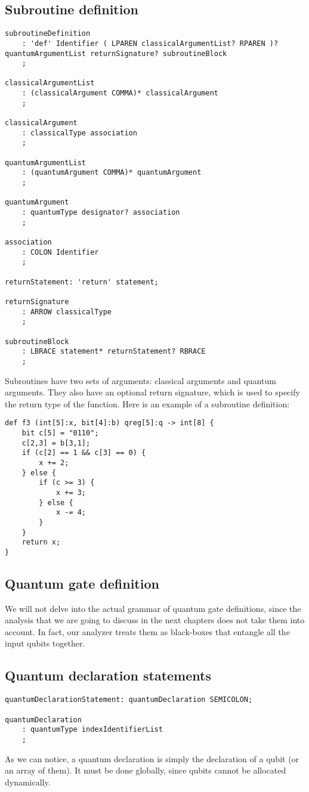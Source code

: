 \documentclass[12pt,a4paper]{report}
\theoremstyle{definition}
\theoremstyle{definition}
\theoremstyle{definition}
\begin{document}
\subsection{Subroutine definition}
\begin{lstlisting}
subroutineDefinition
    : 'def' Identifier ( LPAREN classicalArgumentList? RPAREN )? quantumArgumentList returnSignature? subroutineBlock
    ;

classicalArgumentList
    : (classicalArgument COMMA)* classicalArgument
    ;

classicalArgument
    : classicalType association
    ;

quantumArgumentList
    : (quantumArgument COMMA)* quantumArgument
    ;

quantumArgument
    : quantumType designator? association
    ;

association
    : COLON Identifier
    ;

returnStatement: 'return' statement;

returnSignature
    : ARROW classicalType
    ;

subroutineBlock
    : LBRACE statement* returnStatement? RBRACE
    ;
\end{lstlisting}

Subroutines have two sets of arguments: classical arguments and quantum arguments. They also have an optional return signature, which is used to specify the return type of the function. Here is an example of a subroutine definition:
\begin{lstlisting}
def f3 (int[5]:x, bit[4]:b) qreg[5]:q -> int[8] {
    bit c[5] = "0110";
    c[2,3] = b[3,1];
    if (c[2] == 1 && c[3] == 0) {
        x += 2;
    } else {
        if (c >= 3) {
            x += 3;
        } else {
            x -= 4;
        }
    }
    return x;
}
\end{lstlisting}


\subsection{Quantum gate definition}
We will not delve into the actual grammar of quantum gate definitions, since the analysis that we are going to discuss in the next chapters does not take them into account. In fact, our analyzer treats them as black-boxes that entangle all the input qubits together.


\subsection{Quantum declaration statements}
\begin{lstlisting}
quantumDeclarationStatement: quantumDeclaration SEMICOLON;

quantumDeclaration
    : quantumType indexIdentifierList
    ;
\end{lstlisting}
As we can notice, a quantum declaration is simply the declaration of a qubit (or an array of them). It must be done globally, since qubits cannot be allocated dynamically.\\
\end{document}
